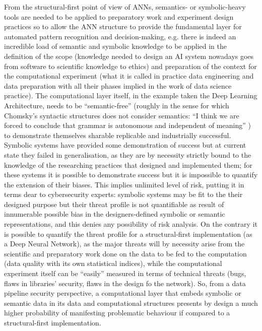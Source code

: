 \documentclass[14pt]{extarticle}
\begin{document}
From the structural-first point of view of ANNs, semantics- or symbolic-heavy tools are needed to be applied to preparatory work and experiment design practices so to allow the ANN structure to provide the fundamental layer for automated pattern recognition and decision-making, e.g. there is indeed an incredible load of semantic and symbolic knowledge to be applied in the definition of the scope (knowledge needed to design an AI system nowadays goes from software to scientific knowledge to ethics) and preparation of the context for the computational experiment (what it is called in practice data engineering and data preparation with all their phases implied in the work of data science practice). The computational layer itself, in the example taken the Deep Learning Architecture, needs to be “semantic-free” (roughly in the sense for which Chomsky’s syntactic structures does not consider semantics: “I think we are forced to conclude that grammar is autonomous and independent of meaning” \cite{chomsky2015syntactic}) to demonstrate themselves sharable replicable and industrially successful. Symbolic systems have provided some demonstration of success \cite{SUNsymconn} but at current state they failed in generalisation, as they are by necessity strictly bound to the knowledge of the researching practices that designed and implemented them; for these systems it is possible to demonstrate success but it is impossible to quantify the extension of their biases. This implies unlimited level of risk, putting it in terms dear to cybersecurity experts: symbolic systems may be fit to the their designed purpose but their threat profile is not quantifiable as result of innumerable possible bias in the designers-defined symbolic or semantic representations, and this denies any possibility of risk analysis. On the contrary it is possible to quantify the threat profile for a structural-first implementation (as a Deep Neural Network), as the major threats will by necessity arise from the scientific and preparatory work done on the data to be fed to the computation (data quality with its own statistical indices), while the computational experiment itself can be “easily” measured in terms of technical threats (bugs, flaws in libraries’ security, flaws in the design fo the network). So, from a data pipeline security perspective, a computational layer that embeds symbolic or semantic data in its data and computational structures presents by design a much higher probability of manifesting problematic behaviour if compared to a structural-first implementation.
\newline
\end{document}
